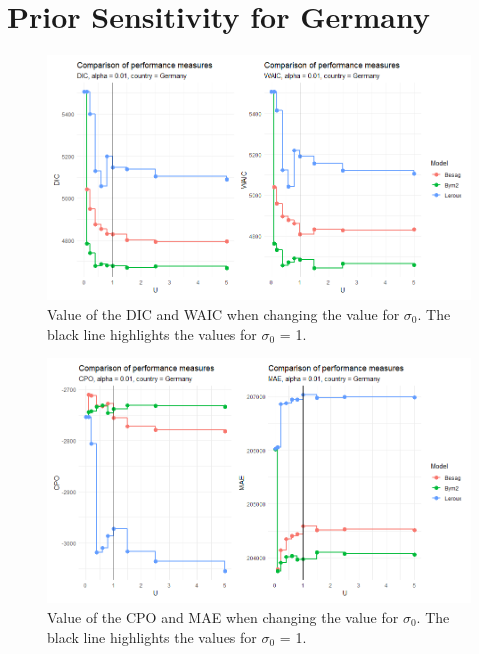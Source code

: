 \section{Prior Sensitivity for Germany}
\begin{figure}[H]
    \centering
    \includegraphics[width = \textwidth]{comparison_1_germany.png}
    \caption{Value of the DIC and WAIC when changing the value for $\sigma_0$. The black line highlights the values for $\sigma_0$ = 1.}
    \label{comparison_germany_1}
\end{figure}
%     
\begin{figure}[H]
    \centering
    \includegraphics[width = \textwidth]{comparison_2_germany.png}
    \caption{Value of the CPO and MAE when changing the value for $\sigma_0$. The black line highlights the values for $\sigma_0$ = 1.}
    \label{comparison_germany_2}
\end{figure}
%     
